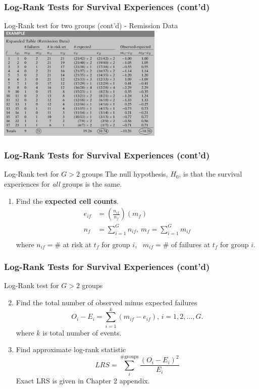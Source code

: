 \documentclass{beamer}
\theoremstyle{definition}
\begin{document}
\begin{frame}
\frametitle{Log-Rank Tests for Survival Experiences (cont'd)}
\begin{block}{Log-Rank test for two groups (cont'd) - Remission Data}
\includegraphics[width =\textwidth, height=5.5cm]{CH2_ComputeLR}
\end{block}
\end{frame}


\begin{frame}
\frametitle{Log-Rank Tests for Survival Experiences (cont'd)}
\begin{block}{Log-Rank test for $G>2$ groups}
The null hypothesis, $H_0$, is that the survival experiences for \textit{all} groups is the same.
\begin{enumerate}
\item Find the \textbf{expected cell counts}.
\begin{align*}
e_{if} & = \left(\frac{n_{if}}{n_{f}}\right)(m_{f}) \\
n_{f} & = \sum_{i=1}^G n_{if}, \, m_f =  \sum_{i=1}^G m_{if}\\
\end{align*}
where $n_{if}=$\# at risk at $t_f$ for group $i$, \, $m_{if}=$\# of failures at $t_f$ for group $i$.
\end{enumerate}
\end{block}
\end{frame}

\begin{frame}
\frametitle{Log-Rank Tests for Survival Experiences (cont'd)}
\begin{block}{Log-Rank test for $G>2$ groups}
\begin{enumerate}
 \setcounter{enumi}{1}
\item Find the total number of observed minus expected failures
\[
O_i - E_i = \sum_{i=1}^k (m_{if} - e_{if}), \, i=1,2, \ldots, G.
\]
where $k$ is total number of events.
\item Find approximate log-rank statistic
\[
LRS = \sum_i^{\text{\# groups}} \frac{(O_i - E_i)^2}{E_i}
\]
Exact LRS is given in Chapter 2 appendix.
\end{enumerate}
\end{block}
\end{frame}
\end{document}
